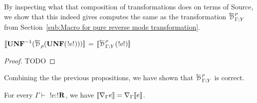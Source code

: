 By inspecting what that composition of transformations does on terms of Source, 
we show that this indeed gives computes the same as the transformation 
$\directD{\rho}{\Gamma}{Y}$ from Section~\ref{sub:Macro for pure reverse mode transformation}. 

\begin{proposition}
    $\seml\UNFSymbol^{-1}(\Dsynrevsymbol_{\rho}(\UNFSymbol($!e!$)))\rrbracket$ = $\seml\directD{\rho}{\Gamma}{Y}($!e!$)\rrbracket$ 
\end{proposition}

\begin{proof}
    TODO
\end{proof}

Combining the the previous propositions, we have shown that $\directD{\rho}{\Gamma}{Y}$ is correct.

\begin{theorem}
    For every $\Gamma \vdash$ !e:!$\mathbf{R}$, we have 
    $\llbracket \nabla_\Gamma e\rrbracket= \nabla_\Gamma\llbracket e\rrbracket$.
\end{theorem}